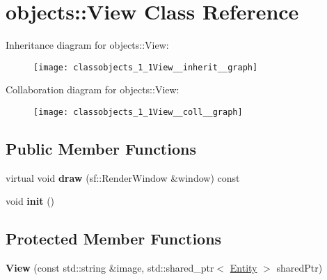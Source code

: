 \hypertarget{classobjects_1_1View}{}\section{objects\+:\+:View Class Reference}
\label{classobjects_1_1View}


Inheritance diagram for objects\+:\+:View\+:\nopagebreak
\begin{figure}[H]
\begin{center}
\leavevmode
\texttt{[image: classobjects\_1\_1View\_\_inherit\_\_graph]}
\end{center}
\end{figure}


Collaboration diagram for objects\+:\+:View\+:\nopagebreak
\begin{figure}[H]
\begin{center}
\leavevmode
\texttt{[image: classobjects\_1\_1View\_\_coll\_\_graph]}
\end{center}
\end{figure}
\subsection*{Public Member Functions}
\begin{DoxyCompactItemize}
\item 
\mbox{\label{classobjects_1_1View_ad552142da711120077dd6bb27c8f7b5f}}
virtual void {\bfseries draw} (sf\+::\+Render\+Window \&window) const
\item 
\mbox{\label{classobjects_1_1View_a3aff15a86a88ee075251cd69d6d23926}}
void {\bfseries init} ()
\end{DoxyCompactItemize}
\subsection*{Protected Member Functions}
\begin{DoxyCompactItemize}
\item 
\mbox{\label{classobjects_1_1View_adc22291b6660cef23f325773b21cc476}}
{\bfseries View} (const std\+::string \&image, std\+::shared\+\_\+ptr$<$ \hyperlink{classobjects_1_1Entity}{Entity} $>$ shared\+Ptr)
\end{DoxyCompactItemize}
